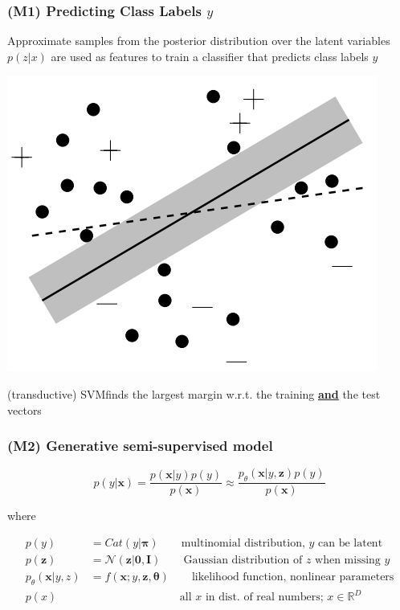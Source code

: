 \documentclass{beamer}
\begin{document}
\begin{frame}
  \frametitle{(M1) Predicting Class Labels $y$}

  Approximate samples from the posterior distribution over the
  latent variables $p(z|x)$ are used as features to train a
  classifier that predicts class labels $y$

  \begin{center}
    \includegraphics[scale=0.5]{fig6_2}
  \end{center}

  (transductive) SVM\footnotemark finds the largest margin w.r.t.
  the training \underline{\textbf{and}} the test vectors


\end{frame}

\begin{frame}
  \frametitle{(M2) Generative semi-supervised model}

  \[
  p(y|\mathbf{x}) = \frac{p(\mathbf{x}|y) p(y)}{p(\mathbf{x})} \approx
  \frac{p_\theta (\mathbf{x}|y, \mathbf{z}) p(y)}{p(\mathbf{x})}
  \]

  where

  \begin{align*}
    p(y) &= Cat(y|\mathbf{\pi}) \qquad \text{multinomial distribution, $y$ can be latent} \\
    p(\mathbf{z}) &= \mathcal{N}(\mathbf{z|0,I}) \qquad
    \text{Gaussian distribution of $z$ when missing $y$} \\
    p_\theta (\mathbf{x}|y,z) &= f(\mathbf{x};y,\mathbf{z},\mathbf{\theta})
    \qquad \text{likelihood function, nonlinear parameters} \\
    p(x) & \qquad \qquad \qquad \qquad \text{all $x$ in dist. of real numbers;  $x \in \mathbb{R}^{D}$}
    \end{align*}
  
\end{frame}
\end{document}
